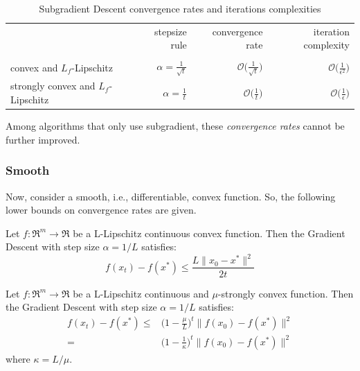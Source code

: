 \begin{table}[H]
\centering
\caption{Subgradient Descent convergence rates and iterations complexities}
\label{subgradient_rates}
\begin{tabular}{lrrr}
\toprule
	& stepsize rule & convergence rate & iteration complexity \\
 	& 		& 		& 		\\
\midrule
convex and $L_f$-Lipschitz & $\displaystyle \alpha = \frac{1}{\sqrt{t}}$ & $\displaystyle \mathcal{O}\Bigg(\frac{1}{\sqrt{t}}\Bigg)$ & $\displaystyle \mathcal{O}\Bigg(\frac{1}{\epsilon^2}\Bigg)$ \\
strongly convex and $L_f$-Lipschitz & $\displaystyle \alpha = \frac{1}{t}$ & $\displaystyle \mathcal{O}\Bigg(\frac{1}{t}\Bigg)$ & $\displaystyle \mathcal{O}\Bigg(\frac{1}{\epsilon}\Bigg)$ \\
\bottomrule
\end{tabular}
\end{table}

Among algorithms that only use subgradient, these \emph{convergence rates} cannot be further improved.


\subsubsection{Smooth}

Now, consider a smooth, i.e., differentiable, convex function. So, the following lower bounds on convergence rates are given.

\begin{theorem}[\href{https://erwanscornet.github.io/teaching/Optimization.pdf\#page=44}{Gradient Descent convergence for convex functions}] \label{thm:cvx_gd_convergence}
Let $f: \Re^m \rightarrow \Re$ be a L-Lipschitz continuous convex function. Then the Gradient Descent with step size $\alpha = 1/L$ satisfies:
$$
f(x_t) - f(x^*) \leq \frac{L \| x_0 - x^* \|^2}{2 t}
$$
\end{theorem}

\begin{theorem}[\href{https://erwanscornet.github.io/teaching/Optimization.pdf\#page=47}{Gradient Descent convergence for strongly convex functions}] \label{thm:str_cvx_gd_convergence}
Let $f: \Re^m \rightarrow \Re$ be a L-Lipschitz continuous and $\mu$-strongly convex function. Then the Gradient Descent with step size $\alpha = 1/L$ satisfies:
$$
\begin{aligned}
	f(x_t) - f(x^*) \leq & \bigg(1 - \frac{\mu}{L}\bigg)^t \| f(x_0) - f(x^*) \|^2 \\
						= & \bigg(1 - \frac{1}{\kappa}\bigg)^t \| f(x_0) - f(x^*) \|^2
\end{aligned}
$$
where $\kappa = L/\mu$.
\end{theorem}

